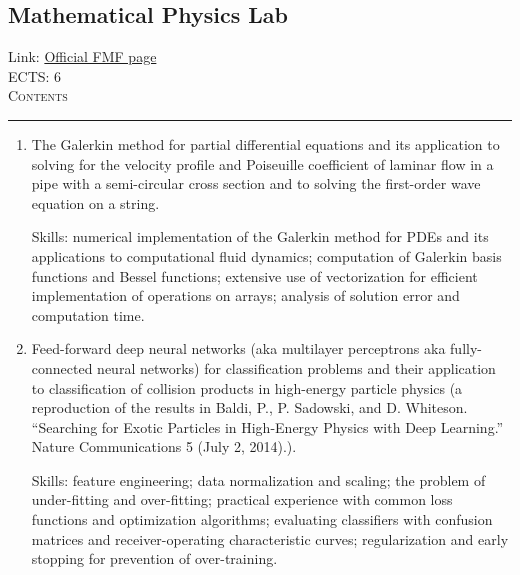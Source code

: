 \documentclass[11pt, a4paper]{article}
\newenvironment{course}[3]{
\subsection{#1}%
Link: \href{#2}{Official FMF page}\\%
ECTS: #3%
\vspace{1ex}
\\
{\large \textsc{Contents}}\\[-0.9ex]%
\rule{\textwidth}{0.5pt}
\vspace{-3ex}
}
{}
\newenvironment{chapter}[1]{
\begin{tcolorbox}[title=#1, breakable]
}
{\end{tcolorbox}}
\begin{document}
\begin{course}{Mathematical Physics Lab}{https://www.fmf.uni-lj.si/en/study-physics/programmes/1fiz/2020/7000777/courses/1159/}{6}
\begin{chapter}{Projects}
\begin{enumerate}
            Skills: numerical implementation of the Crank-Nicolson method for PDEs; unitary approximations of the Hamiltonian operator;
            Padé approximation of the exponential function and implementation of higher-order position and time generalizations of the Crank-Nicolson method (a reproduction of the results in W. van Dijk and F. M. Toyama. ``Accurate numerical solutions of the time-dependent Schrödinger equation.'' Phys. Rev. E \textbf{75}, 036707 (2007).);
            analysis of computation time and solution accuracy.

            \item The Galerkin method for partial differential equations and its application to solving for the velocity profile and Poiseuille coefficient of laminar flow in a pipe with a semi-circular cross section and to solving the first-order wave equation on a string.

            Skills: numerical implementation of the Galerkin method for PDEs and its applications to computational fluid dynamics; computation of Galerkin basis functions and Bessel functions; extensive use of vectorization for efficient implementation of operations on arrays; analysis of solution error and computation time.

            \item Feed-forward deep neural networks (aka multilayer perceptrons aka fully-connected neural networks) for classification problems and their application to classification of collision products in high-energy particle physics (a reproduction of the results in Baldi, P., P. Sadowski, and D. Whiteson. “Searching for Exotic Particles in High-Energy Physics with Deep Learning.” Nature Communications 5 (July 2, 2014).).

            Skills: feature engineering; data normalization and scaling; the problem of under-fitting and over-fitting; practical experience with common loss functions and optimization algorithms; evaluating classifiers with confusion matrices and receiver-operating characteristic curves; regularization and early stopping for prevention of over-training.
        
        \end{enumerate}
    \end{chapter}
\end{course}
\end{document}
